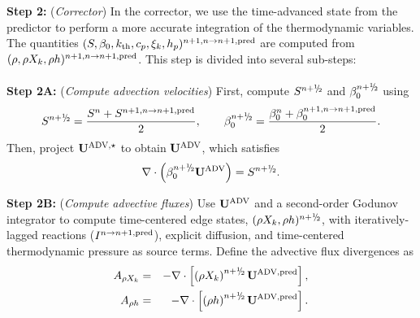 {\bf Step 2:} ({\it Corrector}) In the corrector, we use the time-advanced state from the predictor to perform a more accurate integration of the thermodynamic variables.  The quantities $(S, \beta_0, k_{\rm th}, c_p, \xi_k, h_p)^{n+1,{n\rightarrow n+1,{\rm pred}}}$ are computed from $(\rho,\rho X_k,\rho h)^{n+1,{n\rightarrow n+1,{\rm pred}}}$.  This step is divided into several sub-steps:\\\\

{\bf Step 2A:} ({\it Compute advection velocities}) First, compute $S^{n+\myhalf}$ and $\beta_0^{n+\myhalf}$ using
\begin{equation}
S^{n+\myhalf} = \frac{S^n + S^{n+1,{n\rightarrow n+1,{\rm pred}}}}{2}, \qquad \beta_0^{n+\myhalf} = \frac{\beta_0^n + \beta_0^{n+1,{n\rightarrow n+1,{\rm pred}}}}{2}.
\end{equation}
Then, project $\mathbf{U}^{\mathrm{ADV},\star}$ to obtain $\mathbf{U}^{\mathrm{ADV}}$, which satisfies
\begin{equation}
\nabla\cdot\left(\beta_0^{n+\myhalf}\uadvsdc\right) = S^{n+\myhalf}.
\end{equation}

{\bf Step 2B:} ({\it Compute advective fluxes}) Use $\mathbf{U}^{\mathrm{ADV}}$ and a second-order Godunov integrator to compute time-centered edge states, $(\rho X_k, \rho h)^{n+\myhalf}$, with iteratively-lagged reactions ($I^{n\rightarrow n+1,{\rm pred}}$), explicit diffusion, and time-centered thermodynamic pressure as source terms.  Define the advective flux divergences as
\begin{eqnarray}
A_{\rho X_k} &=& -\nabla\cdot\left[\left(\rho X_k\right)^{n+\myhalf}\uadvsdcpred\right],\\
A_{\rho h} &=& -\nabla\cdot\left[\left(\rho h\right)^{n+\myhalf}\uadvsdcpred\right].
\end{eqnarray}

